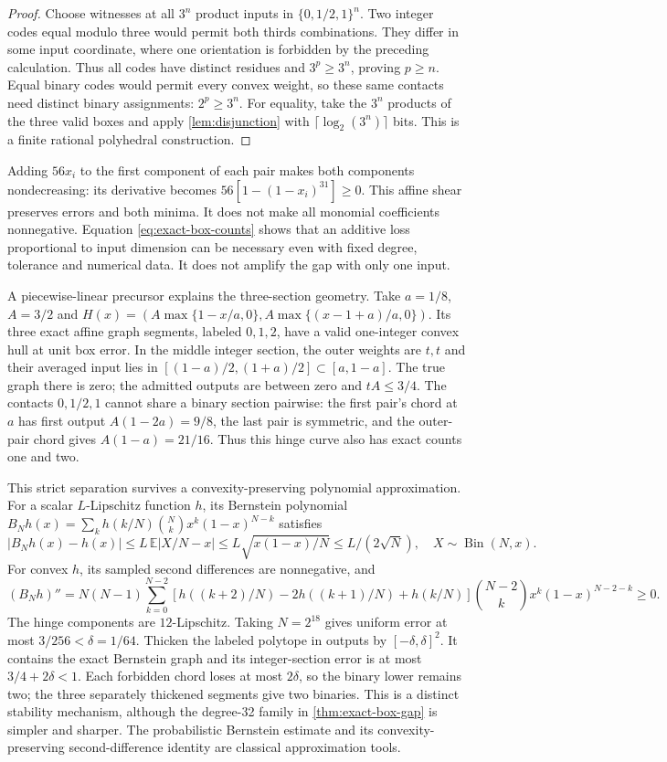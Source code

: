 \begin{proof}
Choose witnesses at all $3^n$ product inputs in $\{0,1/2,1\}^n$.
Two integer codes equal modulo three would permit both thirds
combinations. They differ in some input coordinate, where one orientation
is forbidden by the preceding calculation. Thus all codes have distinct
residues and $3^p\ge3^n$, proving $p\ge n$.
Equal binary codes would permit every convex weight, so these same
contacts need distinct binary assignments: $2^p\ge3^n$.
For equality, take the $3^n$ products of the three valid boxes and
apply \cref{lem:disjunction} with $\lceil\log_2(3^n)\rceil$ bits.
This is a finite rational polyhedral construction.
\end{proof}

Adding $56x_i$ to the first component of each pair makes both components
nondecreasing: its derivative becomes $56[1-(1-x_i)^{31}]\ge0$.
This affine shear preserves errors and both minima. It does not make
all monomial coefficients nonnegative. Equation \eqref{eq:exact-box-counts}
shows that an additive loss proportional to input dimension can be
necessary even with fixed degree, tolerance and numerical data. It does
not amplify the gap with only one input.

A piecewise-linear precursor explains the three-section geometry.
Take $a=1/8$, $A=3/2$ and
$H(x)=(A\max\{1-x/a,0\},A\max\{(x-1+a)/a,0\})$.
Its three exact affine graph segments, labeled $0,1,2$, have a valid
one-integer convex hull at unit box error. In the middle integer section,
the outer weights are $t,t$ and their averaged input lies in
$[(1-a)/2,(1+a)/2]\subset[a,1-a]$. The true graph there is zero;
the admitted outputs are between zero and $tA\le3/4$.
The contacts $0,1/2,1$ cannot share a binary section pairwise: the
first pair's chord at $a$ has first output $A(1-2a)=9/8$, the last
pair is symmetric, and the outer-pair chord gives $A(1-a)=21/16$.
Thus this hinge curve also has exact counts one and two.

This strict separation survives a convexity-preserving polynomial
approximation. For a scalar $L$-Lipschitz function $h$, its Bernstein
polynomial $B_Nh(x)=\sum_kh(k/N)\binom Nkx^k(1-x)^{N-k}$ satisfies
\begin{equation}\label{eq:bernstein-lipschitz}
 |B_Nh(x)-h(x)|
 \le L\,\mathbb E|X/N-x|
 \le L\sqrt{x(1-x)/N}\le L/(2\sqrt N),
 \quad X\sim\operatorname{Bin}(N,x).
\end{equation}
For convex $h$, its sampled second differences are nonnegative, and
\[
 (B_Nh)''=N(N-1)\sum_{k=0}^{N-2}
 [h((k+2)/N)-2h((k+1)/N)+h(k/N)]
 \binom{N-2}{k}x^k(1-x)^{N-2-k}\ge0.
\]
The hinge components are $12$-Lipschitz. Taking $N=2^{18}$ gives
uniform error at most $3/256<\delta=1/64$. Thicken the labeled
polytope in outputs by $[-\delta,\delta]^2$. It contains the exact
Bernstein graph and its integer-section error is at most
$3/4+2\delta<1$. Each forbidden chord loses at most $2\delta$,
so the binary lower remains two; the three separately thickened segments
give two binaries. This is a distinct stability mechanism, although the
degree-32 family in \cref{thm:exact-box-gap} is simpler and sharper.
The probabilistic Bernstein estimate and its convexity-preserving
second-difference identity are classical approximation tools.

